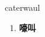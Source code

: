 
\begin{frame}
{\huge caterwaul}
\begin{center}
\begin{enumerate}\Large
  \item \textbf{嚎叫}
\end{enumerate}
\end{center}
\end{frame}

